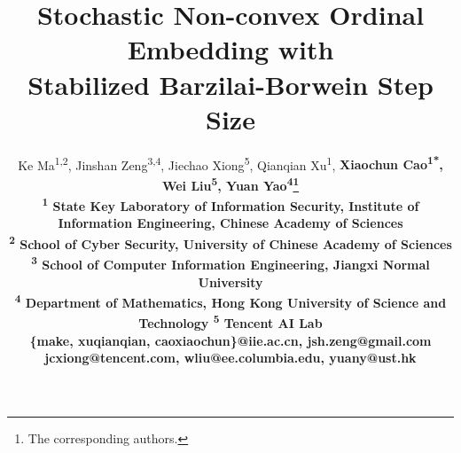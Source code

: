 \documentclass[letterpaper]{article} %
\begin{document}
%
\title{Stochastic Non-convex Ordinal Embedding with \\Stabilized Barzilai-Borwein Step Size}
\author
{
		Ke Ma\textsuperscript{1,2}, Jinshan Zeng\textsuperscript{3,4}, Jiechao Xiong\textsuperscript{5}, Qianqian Xu\textsuperscript{1}, 
		\bf\Large{Xiaochun Cao\textsuperscript{1*}, Wei Liu\textsuperscript{5}, Yuan Yao\textsuperscript{4}\thanks{The corresponding authors.}}\\
		\textsuperscript{1} State Key Laboratory of Information Security, Institute of Information Engineering, Chinese Academy of Sciences\\
		\textsuperscript{2} School of Cyber Security, University of Chinese Academy of Sciences\\
		\textsuperscript{3} School of Computer Information Engineering, Jiangxi Normal University\\
		\textsuperscript{4} Department of Mathematics, Hong Kong University of Science and Technology \textsuperscript{5} Tencent AI Lab\\
		\{make, xuqianqian, caoxiaochun\}@iie.ac.cn, jsh.zeng@gmail.com\\
		jcxiong@tencent.com, wliu@ee.columbia.edu, yuany@ust.hk
}
\maketitle
\end{document}
